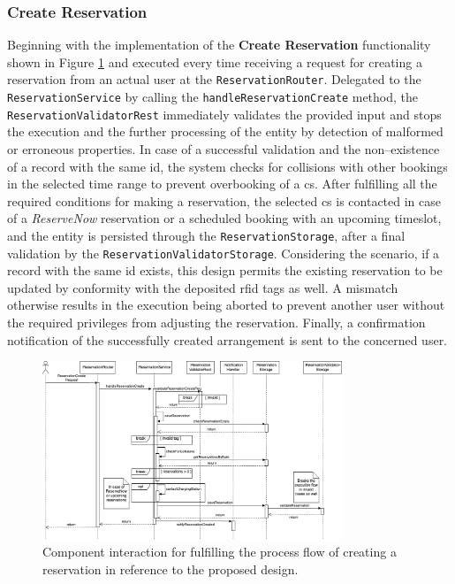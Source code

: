 \subsubsection{Create Reservation}
\label{ch:Implementation:sec:Reservation System:ssec:Management Capabilities:sssec:Create Reservation}

Beginning with the implementation of the \textbf{Create Reservation} functionality shown in Figure \ref{fig:create-reservation-seqflow} and executed every time receiving a request for creating a reservation from an actual user at the \texttt{ReservationRouter}. 
Delegated to the \texttt{ReservationService} by calling the \texttt{handleReservationCreate} method, the \texttt{ReservationValidatorRest} immediately validates the provided input and stops the execution and the further processing of the entity by detection of malformed or erroneous properties.
In case of a successful validation and the non--existence of a record with the same \acrshort{id}, the system checks for collisions with other bookings in the selected time range to prevent overbooking of a \acrshort{cs}.
After fulfilling all the required conditions for making a reservation, the selected \acrshort{cs} is contacted in case of a \textit{ReserveNow} reservation or a scheduled booking with an upcoming timeslot, and the entity is persisted through the \texttt{ReservationStorage}, after a final validation by the \texttt{ReservationValidatorStorage}.
Considering the scenario, if a record with the same \acrshort{id} exists, this design permits the existing reservation to be updated by conformity with the deposited \acrshort{rfid} tags as well. A mismatch otherwise results in the execution being aborted to prevent another user without the required privileges from adjusting the reservation.
Finally, a confirmation notification of the successfully created arrangement is sent to the concerned user.

\begin{figure}[h]
    \centering
    \includegraphics[width=0.8\textwidth,keepaspectratio]{resources/images/main/6_implementation/processes/ReservationCreate.png}
    \caption{Component interaction for fulfilling the process flow of creating a reservation in reference to the proposed design.}
    \label{fig:create-reservation-seqflow}
\end{figure}

